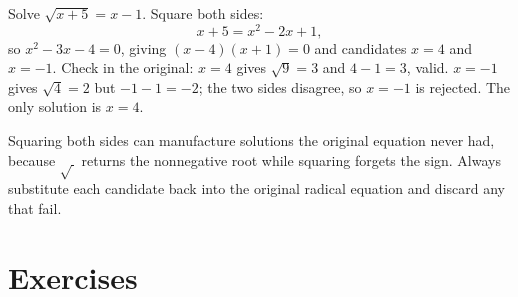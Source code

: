 \documentclass[12pt]{book}
\begin{document}
\begin{example}
Solve $\sqrt{x+5}=x-1$. Square both sides:
\[
x+5=x^2-2x+1,
\]
so $x^2-3x-4=0$, giving $(x-4)(x+1)=0$ and candidates $x=4$ and $x=-1$. Check in the
original: $x=4$ gives $\sqrt{9}=3$ and $4-1=3$, valid. $x=-1$ gives $\sqrt{4}=2$ but
$-1-1=-2$; the two sides disagree, so $x=-1$ is rejected. The only solution is
$x=4$.
\end{example}

\begin{pitfall}
Squaring both sides can manufacture solutions the original equation never had,
because $\sqrt{\,}$ returns the nonnegative root while squaring forgets the sign.
Always substitute each candidate back into the original radical equation and discard
any that fail.
\end{pitfall}

\section{Exercises}
\end{document}
